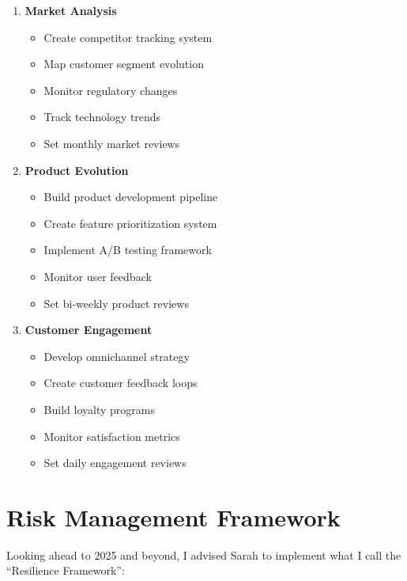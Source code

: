 \begin{tcolorbox}[colback=white,colframe=primarydark,title=\textbf{Market Positioning Steps}]
\begin{enumerate}
    \item \textbf{Market Analysis}
    \begin{itemize}
        \item Create competitor tracking system
        \item Map customer segment evolution
        \item Monitor regulatory changes
        \item Track technology trends
        \item Set monthly market reviews
    \end{itemize}

    \item \textbf{Product Evolution}
    \begin{itemize}
        \item Build product development pipeline
        \item Create feature prioritization system
        \item Implement A/B testing framework
        \item Monitor user feedback
        \item Set bi-weekly product reviews
    \end{itemize}

    \item \textbf{Customer Engagement}
    \begin{itemize}
        \item Develop omnichannel strategy
        \item Create customer feedback loops
        \item Build loyalty programs
        \item Monitor satisfaction metrics
        \item Set daily engagement reviews
    \end{itemize}
\end{enumerate}
\end{tcolorbox}

\section{Risk Management Framework}\label{sec:risk-management}

Looking ahead to 2025 and beyond, I advised Sarah to implement what I call the ``Resilience Framework'':

